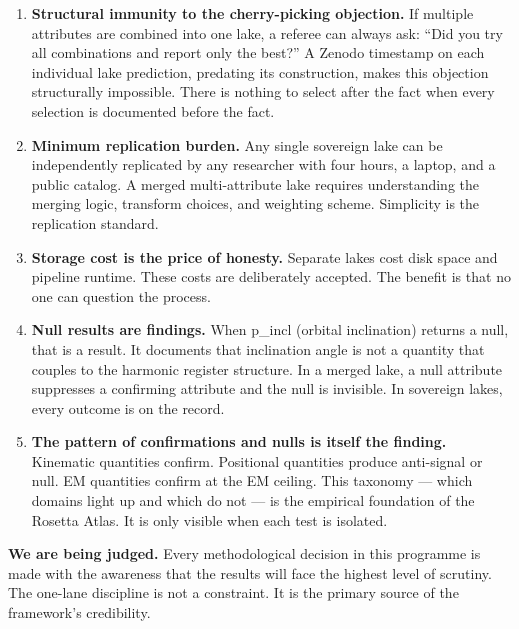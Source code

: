 \documentclass[12pt,a4paper]{article}
\begin{document}
\begin{enumerate}
  \item \textbf{Structural immunity to the cherry-picking objection.}
  If multiple attributes are combined into one lake, a referee can always ask:
  ``Did you try all combinations and report only the best?'' A Zenodo timestamp
  on each individual lake prediction, predating its construction, makes this
  objection structurally impossible. There is nothing to select after the fact
  when every selection is documented before the fact.

  \item \textbf{Minimum replication burden.}
  Any single sovereign lake can be independently replicated by any researcher
  with four hours, a laptop, and a public catalog. A merged multi-attribute lake
  requires understanding the merging logic, transform choices, and weighting
  scheme. Simplicity is the replication standard.

  \item \textbf{Storage cost is the price of honesty.}
  Separate lakes cost disk space and pipeline runtime. These costs are
  deliberately accepted. The benefit is that no one can question the process.

  \item \textbf{Null results are findings.}
  When p\_incl (orbital inclination) returns a null, that is a result. It
  documents that inclination angle is not a quantity that couples to the
  harmonic register structure. In a merged lake, a null attribute suppresses
  a confirming attribute and the null is invisible. In sovereign lakes, every
  outcome is on the record.

  \item \textbf{The pattern of confirmations and nulls is itself the finding.}
  Kinematic quantities confirm. Positional quantities produce anti-signal or
  null. EM quantities confirm at the EM ceiling. This taxonomy --- which domains
  light up and which do not --- is the empirical foundation of the Rosetta Atlas.
  It is only visible when each test is isolated.
\end{enumerate}

\textbf{We are being judged.} Every methodological decision in this programme
is made with the awareness that the results will face the highest level of
scrutiny. The one-lane discipline is not a constraint. It is the primary source
of the framework's credibility.

\end{document}
